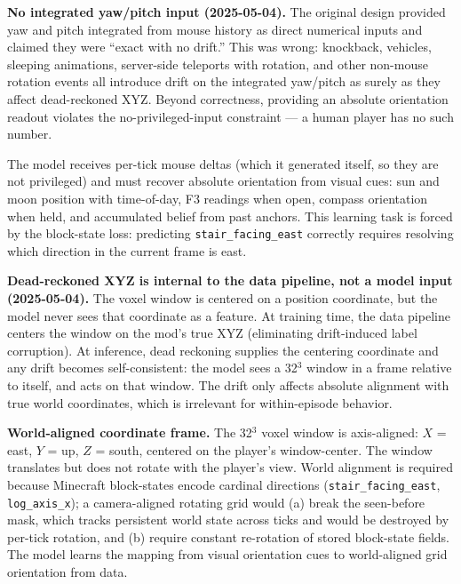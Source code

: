 \documentclass[11pt,a4paper]{article}
\begin{document}
\begin{designdecision}
\textbf{No integrated yaw/pitch input (2025-05-04).} The original design provided yaw and pitch integrated from mouse history as direct numerical inputs and claimed they were ``exact with no drift.'' This was wrong: knockback, vehicles, sleeping animations, server-side teleports with rotation, and other non-mouse rotation events all introduce drift on the integrated yaw/pitch as surely as they affect dead-reckoned XYZ. Beyond correctness, providing an absolute orientation readout violates the no-privileged-input constraint --- a human player has no such number.

The model receives per-tick mouse deltas (which it generated itself, so they are not privileged) and must recover absolute orientation from visual cues: sun and moon position with time-of-day, F3 readings when open, compass orientation when held, and accumulated belief from past anchors. This learning task is forced by the block-state loss: predicting \texttt{stair\_facing\_east} correctly requires resolving which direction in the current frame is east.
\end{designdecision}

\begin{designdecision}
\textbf{Dead-reckoned XYZ is internal to the data pipeline, not a model input (2025-05-04).} The voxel window is centered on a position coordinate, but the model never sees that coordinate as a feature. At training time, the data pipeline centers the window on the mod's true XYZ (eliminating drift-induced label corruption). At inference, dead reckoning supplies the centering coordinate and any drift becomes self-consistent: the model sees a 32$^3$ window in a frame relative to itself, and acts on that window. The drift only affects absolute alignment with true world coordinates, which is irrelevant for within-episode behavior.
\end{designdecision}

\begin{designdecision}
\textbf{World-aligned coordinate frame.} The 32$^3$ voxel window is axis-aligned: $X$ = east, $Y$ = up, $Z$ = south, centered on the player's window-center. The window translates but does not rotate with the player's view. World alignment is required because Minecraft block-states encode cardinal directions (\texttt{stair\_facing\_east}, \texttt{log\_axis\_x}); a camera-aligned rotating grid would (a) break the seen-before mask, which tracks persistent world state across ticks and would be destroyed by per-tick rotation, and (b) require constant re-rotation of stored block-state fields. The model learns the mapping from visual orientation cues to world-aligned grid orientation from data.
\end{designdecision}
\end{document}
